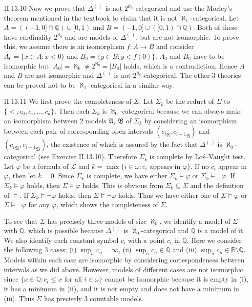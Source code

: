 \documentclass[12pt]{article}
\begin{document}
\begin{customthm}{II.13.10}
  Now we prove that $\Delta^{(~)}$ is not $2^{\aleph_0}$-categorical and use the Morley's theorem mentioned in the textbook to claim that it is not $\aleph_1$-categorical. Let $A=((-1,0]\cap\mathbb{Q})\cup[0,1)$ and $B=(-1,0]\cup([0,1)\cap\mathbb{Q})$. Both of these have cardinality $2^{\aleph_0}$ and are models of $\Delta^{(~)}$, but are not isomorphic. To prove this, we assume there is an isomorphism $f:A\rightarrow B$ and consider $A_0=\{x\in A:x<0\}$ and $B_0=\{y\in B:y<f(0)\}$. $A_0$ and $B_0$ have to be isomorphic but $|A_0|=\aleph_0\neq2^{\aleph_0}=|B_0|$ holds, which is a contradiction. Hence $A$ and $B$ are not isomorphic and $\Delta^{(~)}$ is not $2^{\aleph_0}$-categorical. The other 3 theories can be proved not to be $\aleph_1$-categorical in a similar way.
\end{customthm}

\begin{customthm}{II.13.11}
  We first prove the completeness of $\Sigma$. Let $\Sigma_k$ be the reduct of $\Sigma$ to  $\{<,c_0,c_i,\ldots,c_k\}$. Then each $\Sigma_k$ is $\aleph_0$-categorical because we can always make an isomorphism between 2 models $\mathfrak{A}$, $\mathfrak{B}$ of $\Sigma_k$ by considering an isomorphism between each pair of corresponding open intervals $({c_{i}}_\mathfrak{A},{c_{i+1}}_\mathfrak{A})$ and $({c_{i}}_\mathfrak{B},{c_{i+1}}_\mathfrak{B})$, the existence of which is assured by the fact that $\Delta^{(~)}$ is $\aleph_0$-categorical (see Exercise II.13.10). Therefore $\Sigma_k$ is complete by Łoś–Vaught test. Let $\varphi$ be a formula of $\mathcal{L}$ and $k=\max\{i\in\omega:c_i \text{ appears in } \varphi\}$. If no $c_i$ appear in $\varphi$, then let $k=0$. Since $\Sigma_k$ is complete, we have either $\Sigma_k\models\varphi$ or $\Sigma_k\models\neg\varphi$. If $\Sigma_k\models\varphi$ holds, then $\Sigma\models\varphi$ holds. This is obvious from $\Sigma_k\subseteq\Sigma$ and the definition of $\models$. If $\Sigma_k\models\neg\varphi$ holds, then $\Sigma\models\neg\varphi$ holds. Thus we have either one of $\Sigma\models\varphi$ or $\Sigma\models\neg\varphi$ for any $\varphi$, which shows the completeness of $\Sigma$.

  To see that $\Sigma$ has precisely three models of size $\aleph_0$, we identify a model of $\Sigma$ with $\mathbb{Q}$, which is possible because $\Delta^{(~)}$ is $\aleph_0$-categorical and $\mathbb{Q}$ is a model of it. We also identify each constant symbol $c_i$ with a point $c_i$ in $\mathbb{Q}$. Here we consider the following 3 cases; (i) $\sup_n c_n=\infty$, (ii) $\sup_n c_n\in\mathbb{Q}$ and (iii) $\sup_n c_n\in\mathbb{R}\setminus\mathbb{Q}$. Models within each case are isomorphic by considering correspondences between intervals as we did above. However, models of different cases are not isomorphic since $\{x\in\mathbb{Q}:c_i\leq x \text{ for all } i\in\omega\}$ cannot be isomorphic because it is empty in (i), it has a minimum in (ii), and it is not empty and does not have a minimum in (iii). Thus $\Sigma$ has precisely 3 countable models.
\end{customthm}
\end{document}
